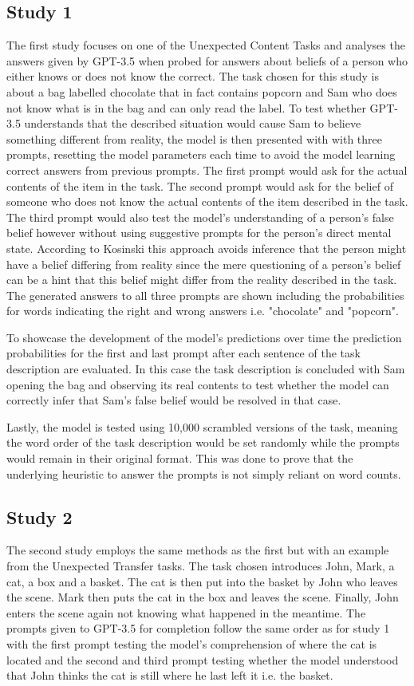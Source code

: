 \subsection{Study 1}
The first study focuses on one of the Unexpected Content Tasks and analyses the answers given by GPT-3.5 when probed for answers about beliefs of a person who either knows or does not know the correct. The task chosen for this study is about a bag labelled chocolate that in fact contains popcorn and Sam who does not know what is in the bag and can only read the label. To test whether GPT-3.5 understands that the described situation would cause Sam to believe something different from reality, the model is then presented with with three prompts, resetting the model parameters each time to avoid the model learning correct answers from previous prompts. The first prompt would ask for the actual contents of the item in the task. The second prompt would ask for the belief of someone who does not know the actual contents of the item described in the task. The third prompt would also test the model's understanding of a person's false belief however without using suggestive prompts for the person's direct mental state. According to Kosinski this approach avoids inference that the person might have a belief differing from reality since the mere questioning of a person's belief can be a hint that this belief might differ from the reality described in the task. The generated answers to all three prompts are shown including the probabilities for words indicating the right and wrong answers i.e. "chocolate" and "popcorn".

To showcase the development of the model's predictions over time the prediction probabilities for the first and last prompt after each sentence of the task description are evaluated. In this case the task description is concluded with Sam opening the bag and observing its real contents to test whether the model can correctly infer that Sam's false belief would be resolved in that case.

Lastly, the model is tested using 10,000 scrambled versions of the task, meaning the word order of the task description would be set randomly while the prompts would remain in their original format. This was done to prove that the underlying heuristic to answer the prompts is not simply reliant on word counts.

\subsection{Study 2}
The second study employs the same methods as the first but with an example from the Unexpected Transfer tasks. The task chosen introduces John, Mark, a cat, a box and a basket. The cat is then put into the basket by John who leaves the scene. Mark then puts the cat in the box and leaves the scene. Finally, John enters the scene again not knowing what happened in the meantime. The prompts given to GPT-3.5 for completion follow the same order as for study 1 with the first prompt testing the model's comprehension of where the cat is located and the second and third prompt testing whether the model understood that John thinks the cat is still where he last left it i.e. the basket.

